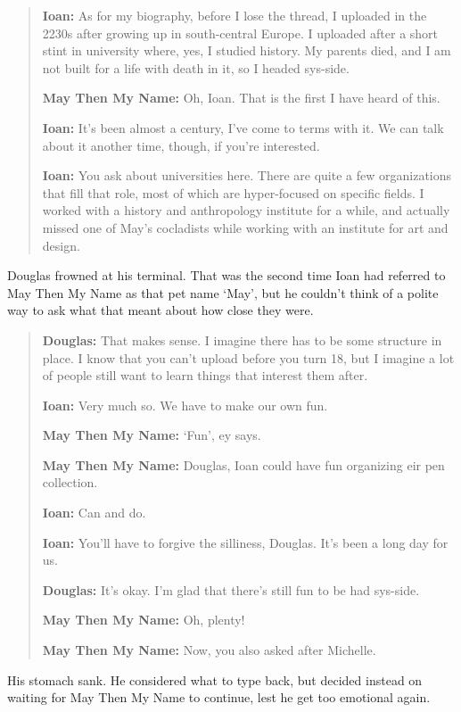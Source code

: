 \begin{quote}
\textbf{Ioan:} As for my biography, before I lose the thread, I uploaded in the 2230s after growing up in south-central Europe. I uploaded after a short stint in university where, yes, I studied history. My parents died, and I am not built for a life with death in it, so I headed sys-side.

\textbf{May Then My Name:} Oh, Ioan. That is the first I have heard of this.

\textbf{Ioan:} It's been almost a century, I've come to terms with it. We can talk about it another time, though, if you're interested.

\textbf{Ioan:} You ask about universities here. There are quite a few organizations that fill that role, most of which are hyper-focused on specific fields. I worked with a history and anthropology institute for a while, and actually missed one of May's cocladists while working with an institute for art and design.
\end{quote}

Douglas frowned at his terminal. That was the second time Ioan had referred to May Then My Name as that pet name `May', but he couldn't think of a polite way to ask what that meant about how close they were.

\begin{quote}
\textbf{Douglas:} That makes sense. I imagine there has to be some structure in place. I know that you can't upload before you turn 18, but I imagine a lot of people still want to learn things that interest them after.

\textbf{Ioan:} Very much so. We have to make our own fun.

\textbf{May Then My Name:} `Fun', ey says.

\textbf{May Then My Name:} Douglas, Ioan could have fun organizing eir pen collection.

\textbf{Ioan:} Can and do.

\textbf{Ioan:} You'll have to forgive the silliness, Douglas. It's been a long day for us.

\textbf{Douglas:} It's okay. I'm glad that there's still fun to be had sys-side.

\textbf{May Then My Name:} Oh, plenty!

\textbf{May Then My Name:} Now, you also asked after Michelle.
\end{quote}

His stomach sank. He considered what to type back, but decided instead on waiting for May Then My Name to continue, lest he get too emotional again.

